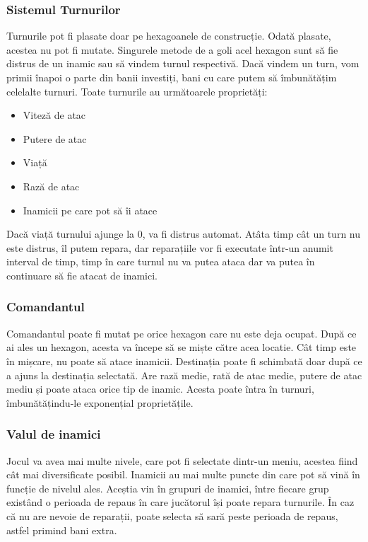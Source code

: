 \documentclass[12pt, a4paper]{article}
\begin{document}
	
	
	
	\subsubsection{Sistemul Turnurilor}
	
	Turnurile pot fi plasate doar pe hexagoanele de construcție. Odată plasate, acestea nu pot fi mutate. Singurele metode de a goli acel hexagon sunt să fie distrus de un inamic sau să vindem turnul respectivă. Dacă vindem un turn, vom primii înapoi o parte din banii investiți, bani cu care putem să îmbunătățim celelalte turnuri. Toate turnurile au următoarele proprietăți:
	\begin{itemize}
		\item Viteză de atac
		\item Putere de atac
		\item Viață
		\item Rază de atac
		\item Inamicii pe care pot să îi atace
	\end{itemize}
	
	Dacă viață turnului ajunge la 0, va fi distrus automat. Atâta timp cât un turn nu este distrus, îl putem repara, dar reparațiile vor fi executate într-un anumit interval de timp, timp în care turnul nu va putea ataca dar va putea în continuare să fie atacat de inamici.
	
	
	
	
	
	\subsubsection{Comandantul}
	
	Comandantul poate fi mutat pe orice hexagon care nu este deja ocupat. După ce ai ales un hexagon, acesta va începe să se miște către acea locatie. Cât timp este în mișcare, nu poate să atace inamicii. Destinația poate fi schimbată doar după ce a ajuns la destinația selectată. Are rază medie, rată de atac medie, putere de atac mediu și poate ataca orice tip de inamic. Acesta poate întra în turnuri, îmbunătățindu-le exponențial proprietățile.
	
	
	
	
	
	\subsubsection{Valul de inamici}
	
	Jocul va avea mai multe nivele, care pot fi selectate dintr-un meniu, acestea fiind cât mai diversificate posibil. Inamicii au mai multe puncte din care pot să vină în funcție de nivelul ales. Aceștia vin în grupuri de inamici, între fiecare grup existând o perioada de repaus în care jucătorul își poate repara turnurile. În caz că nu are nevoie de reparații, poate selecta să sară peste perioada de repaus, astfel primind bani extra.
	
\end{document}
